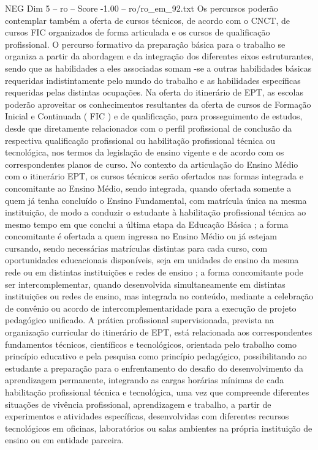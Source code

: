 \begin{textsample}{NEG Dim 5 – ro – Score -1.00 – ro/ro\_em\_92.txt}
Os percursos poderão contemplar também a oferta de cursos técnicos, de acordo com o CNCT, de cursos FIC organizados de forma articulada e os cursos de qualificação profissional.
O percurso formativo da preparação básica para o trabalho se organiza a partir da abordagem e da integração dos diferentes eixos estruturantes, sendo que as habilidades a eles associadas somam -se a outras habilidades básicas requeridas indistintamente pelo mundo do trabalho e as habilidades específicas requeridas pelas distintas ocupações.
Na oferta do itinerário de EPT, as escolas poderão aproveitar os conhecimentos resultantes da oferta de cursos de Formação Inicial e Continuada ( FIC ) e de qualificação, para prosseguimento de estudos, desde que diretamente relacionados com o perfil profissional de conclusão da respectiva qualificação profissional ou habilitação profissional técnica ou tecnológica, nos termos da legislação de ensino vigente e de acordo com os correspondentes planos de curso.
No contexto da articulação do Ensino Médio com o itinerário EPT, os cursos técnicos serão ofertados nas formas integrada e concomitante ao Ensino Médio, sendo integrada, quando ofertada somente a quem já tenha concluído o Ensino Fundamental, com matrícula única na mesma instituição, de modo a conduzir o estudante à habilitação profissional técnica ao mesmo tempo em que conclui a última etapa da Educação Básica ; a forma concomitante é ofertada a quem ingressa no Ensino Médio ou já estejam cursando, sendo necessárias matrículas distintas para cada curso, com oportunidades educacionais disponíveis, seja em unidades de ensino da mesma rede ou em distintas instituições e redes de ensino ; a forma concomitante pode ser intercomplementar, quando desenvolvida simultaneamente em distintas instituições ou redes de ensino, mas integrada no conteúdo, mediante a celebração de convênio ou acordo de intercomplementaridade para a execução de projeto pedagógico unificado.
A prática profissional supervisionada, prevista na organização curricular do itinerário de EPT, está relacionada aos correspondentes fundamentos técnicos, científicos e tecnológicos, orientada pelo trabalho como princípio educativo e pela pesquisa como princípio pedagógico, possibilitando ao estudante a preparação para o enfrentamento do desafio do desenvolvimento da aprendizagem permanente, integrando as cargas horárias mínimas de cada habilitação profissional técnica e tecnológica, uma vez que compreende diferentes situações de vivência profissional, aprendizagem e trabalho, a partir de experimentos e atividades específicas, desenvolvidas com diferentes recursos tecnológicos em oficinas, laboratórios ou salas ambientes na própria instituição de ensino ou em entidade parceira.

\end{textsample}
